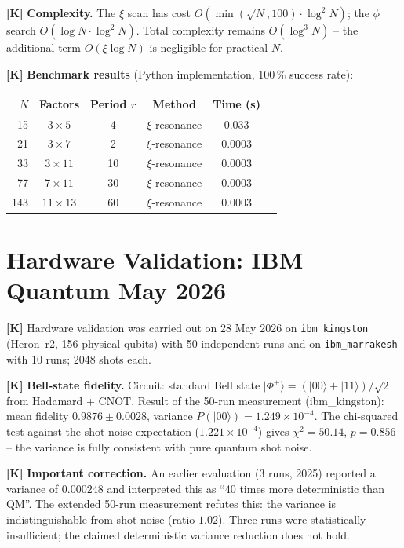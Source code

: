 \textbf{[K]} \textbf{Complexity.} The $\xi$ scan has cost
$O(\min(\sqrt N,100)\cdot\log^2N)$; the $\phi$ search $O(\log N\cdot\log^2N)$.
Total complexity remains $O(\log^3N)$ -- the additional term
$O(\xi\log N)$ is negligible for practical $N$.

\textbf{[K]} \textbf{Benchmark results} (Python implementation, 100\,\% success rate):

\begin{center}
\renewcommand{\arraystretch}{1.3}
{\small
\begin{tabular}{rccccc}
\toprule
$N$ & Factors & Period $r$ & Method & Time (s) \\
\midrule
15  & $3\times5$   &  4 & $\xi$-resonance & 0.033 \\
21  & $3\times7$   &  2 & $\xi$-resonance & 0.0003 \\
33  & $3\times11$  & 10 & $\xi$-resonance & 0.0003 \\
77  & $7\times11$  & 30 & $\xi$-resonance & 0.0003 \\
143 & $11\times13$ & 60 & $\xi$-resonance & 0.0003 \\
\bottomrule
\end{tabular}
}
\renewcommand{\arraystretch}{1.0}
\end{center}

\section{Hardware Validation: IBM Quantum May 2026}

\textbf{[K]} Hardware validation was carried out on 28 May 2026 on
\texttt{ibm\_kingston} (Heron~r2, 156 physical qubits) with 50 independent
runs and on \texttt{ibm\_marrakesh} with 10 runs; 2048 shots each.

\textbf{[K]} \textbf{Bell-state fidelity.} Circuit: standard Bell state
$|\Phi^+\rangle=(|00\rangle+|11\rangle)/\sqrt2$ from Hadamard + CNOT. Result of
the 50-run measurement (ibm\_kingston): mean fidelity $0{.}9876\pm0{.}0028$,
variance $P(|00\rangle) = 1{.}249\times10^{-4}$. The chi-squared test against the
shot-noise expectation ($1{.}221\times10^{-4}$) gives $\chi^2=50{.}14$,
$p=0{.}856$ -- the variance is fully consistent with pure quantum shot noise.

\textbf{[K]} \textbf{Important correction.} An earlier evaluation (3 runs, 2025)
reported a variance of $0{.}000248$ and interpreted this as ``40 times more
deterministic than QM''. The extended 50-run measurement refutes this: the variance
is indistinguishable from shot noise (ratio $1{.}02$). Three runs were statistically
insufficient; the claimed deterministic variance reduction does not hold.

